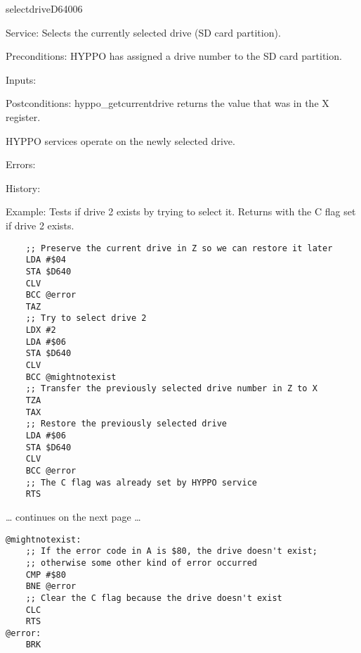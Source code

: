 \newpage
\begin{hyppotrap}{selectdrive}{D640}{06}
\item [Service:]
  Selects the currently selected drive (SD card partition).
\item [Preconditions:]
  HYPPO has assigned a drive number to the SD card partition.
\item [Inputs:]
\item [Postconditions:]
  hyppo\_getcurrentdrive returns the value that was in the X register.

  HYPPO services operate on the newly selected drive.
\item [Errors:]
\item [History:]
\item [Example:]
  Tests if drive 2 exists by trying to select it. Returns with the C flag set if
  drive 2 exists.

\begin{tcolorbox}[colback=black,coltext=white]
\verbatimfont{\codefont}
\begin{verbatim}
    ;; Preserve the current drive in Z so we can restore it later
    LDA #$04
    STA $D640
    CLV
    BCC @error
    TAZ
    ;; Try to select drive 2
    LDX #2
    LDA #$06
    STA $D640
    CLV
    BCC @mightnotexist
    ;; Transfer the previously selected drive number in Z to X
    TZA
    TAX
    ;; Restore the previously selected drive
    LDA #$06
    STA $D640
    CLV
    BCC @error
    ;; The C flag was already set by HYPPO service
    RTS
\end{verbatim}
\end{tcolorbox}

\ldots{} continues on the next page \ldots

\begin{tcolorbox}[colback=black,coltext=white]
\verbatimfont{\codefont}
\begin{verbatim}
@mightnotexist:
    ;; If the error code in A is $80, the drive doesn't exist;
    ;; otherwise some other kind of error occurred
    CMP #$80
    BNE @error
    ;; Clear the C flag because the drive doesn't exist
    CLC
    RTS
@error:
    BRK
\end{verbatim}
\end{tcolorbox}
\end{hyppotrap}


